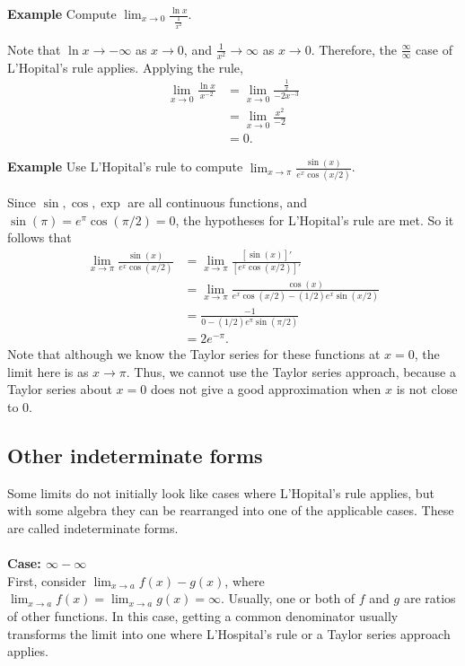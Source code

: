 \documentclass[a4paper]{book}
\begin{document}
\begin{sloppypar}
\textbf{Example} Compute $\displaystyle \lim_{x \rightarrow 0} \frac{\ln x}{\frac{1}{x^2}}$.
\begin{examplebox}
Note that $\ln x \rightarrow -\infty$ as $x \rightarrow 0$, and $\frac{1}{x^2} \rightarrow \infty$ as $x \rightarrow 0$. Therefore, the $\frac{\infty}{\infty}$ case of L'Hopital's rule applies. Applying the rule,
\begin{align*}
\lim_{x \rightarrow 0} \frac{\ln x}{x^{-2}} &= \lim_{x \rightarrow 0} \frac{\frac{1}{x}}{-2 x^{-3}} \\
&= \lim_{x\rightarrow 0} \frac{x^2}{-2} \\
&= 0.
\end{align*}
\end{examplebox}

\textbf{Example} Use L'Hopital's rule to compute $\displaystyle \lim_{x\rightarrow \pi} \frac{\sin(x)}{e^x \cos(x/2)}$. 
\begin{examplebox}
Since $\sin, \cos, \exp$ are all continuous functions, and $\sin(\pi) = e^{\pi} \cos (\pi/2) = 0$, the hypotheses for L'Hopital's rule are met. So it follows that
\begin{align*}
\lim_{x\rightarrow \pi} \frac{\sin(x)}{e^x \cos(x/2)} &= \lim_{x\rightarrow \pi} \frac{[\sin(x)]'}{[e^x \cos(x/2)]'} \\
&= \lim_{x \rightarrow \pi} \frac{\cos(x)}{e^x \cos(x/2) -(1/2)e^x\sin(x/2)} \\
&= \frac{-1}{0 - (1/2)e^{\pi} \sin(\pi/2)} \\
&= 2e^{-\pi}. 
\end{align*}
Note that although we know the Taylor series for these functions at $x=0$, the limit here is as $x \rightarrow \pi$. Thus, we cannot use the Taylor series approach, because a Taylor series about $x=0$ does not give a good approximation when $x$ is not close to 0.
\end{examplebox}

\subsection{Other indeterminate forms}
Some limits do not initially look like cases where L'Hopital's rule applies, but with some algebra they can be rearranged into one of the applicable cases. These are called indeterminate forms.\\\\
\textbf{Case: $\infty - \infty$}\\

First, consider $\displaystyle \lim_{x \rightarrow a} f(x) - g(x)$, where $\displaystyle \lim_{x \rightarrow a} f(x) = \lim_{x\rightarrow a} g(x) = \infty$. Usually, one or both of $f$ and $g$ are ratios of other functions. In this case, getting a common denominator usually transforms the limit into one where L'Hospital's rule or a Taylor series approach applies.


\end{sloppypar}
\end{document}
